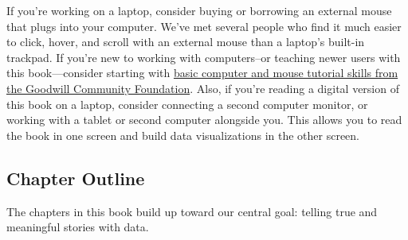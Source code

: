 \documentclass[
  english,
]{book}
\begin{document}
If you're working on a laptop, consider buying or borrowing an external mouse that plugs into your computer. We've met several people who find it much easier to click, hover, and scroll with an external mouse than a laptop's built-in trackpad. If you're new to working with computers--or teaching newer users with this book---consider starting with \href{https://edu.gcfglobal.org/en/subjects/basic-skills/}{basic computer and mouse tutorial skills from the Goodwill Community Foundation}. Also, if you're reading a digital version of this book on a laptop, consider connecting a second computer monitor, or working with a tablet or second computer alongside you. This allows you to read the book in one screen and build data visualizations in the other screen.

\hypertarget{chapter-outline}{%
\subsection*{Chapter Outline}\label{chapter-outline}}

The chapters in this book build up toward our central goal: telling true and meaningful stories with data.
\end{document}
